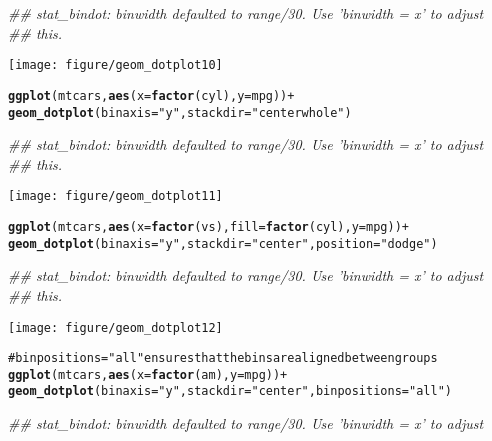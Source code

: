 \documentclass[a4paper,titlepage]{tufte-handout}\usepackage{graphicx, color}
\makeatletter
\def\maxwidth{ %
  \ifdim\Gin@nat@width>\linewidth
    \linewidth
  \else
    \Gin@nat@width
  \fi
}
\newcommand{\hlfunctioncall}[1]{\textcolor[rgb]{0.501960784313725,0,0.329411764705882}{\textbf{#1}}}%
\newcommand{\hlstring}[1]{\textcolor[rgb]{0.6,0.6,1}{#1}}%
\newenvironment{kframe}{%
 \def\at@end@of@kframe{}%
 \ifinner\ifhmode%
  \def\at@end@of@kframe{\end{minipage}}%
  \begin{minipage}{\columnwidth}%
 \fi\fi%
 \def\FrameCommand##1{\hskip\@totalleftmargin \hskip-\fboxsep
 \colorbox{shadecolor}{##1}\hskip-\fboxsep
     \hskip-\linewidth \hskip-\@totalleftmargin \hskip\columnwidth}%
 \MakeFramed {\advance\hsize-\width
   \@totalleftmargin\z@ \linewidth\hsize
   \@setminipage}}%
 {\par\unskip\endMakeFramed%
 \at@end@of@kframe}
\newenvironment{knitrout}{}{} %
\makeatother
\begin{document}
\begin{knitrout}
\begin{kframe}
\begin{alltt}
\end{alltt}
\begin{flushleft}\ttfamily\noindent\itshape\textcolor{messagecolor}{\#\# stat\_bindot: binwidth defaulted to range/30. Use 'binwidth = x' to adjust \\ 
\#\# this.}\end{flushleft}\end{kframe}\texttt{[image: figure/geom\_dotplot10]} \begin{kframe}\begin{alltt}
\hlfunctioncall{ggplot}(mtcars, \hlfunctioncall{aes}(x = \hlfunctioncall{factor}(cyl), y = mpg)) +
  \hlfunctioncall{geom_dotplot}(binaxis = \hlstring{"y"}, stackdir = \hlstring{"centerwhole"})
\end{alltt}
\begin{flushleft}\ttfamily\noindent\itshape\textcolor{messagecolor}{\#\# stat\_bindot: binwidth defaulted to range/30. Use 'binwidth = x' to adjust \\ 
\#\# this.}\end{flushleft}\end{kframe}\texttt{[image: figure/geom\_dotplot11]} \begin{kframe}\begin{alltt}
\hlfunctioncall{ggplot}(mtcars, \hlfunctioncall{aes}(x = \hlfunctioncall{factor}(vs), fill = \hlfunctioncall{factor}(cyl), y = mpg)) +
  \hlfunctioncall{geom_dotplot}(binaxis = \hlstring{"y"}, stackdir = \hlstring{"center"}, position = \hlstring{"dodge"})
\end{alltt}
\begin{flushleft}\ttfamily\noindent\itshape\textcolor{messagecolor}{\#\# stat\_bindot: binwidth defaulted to range/30. Use 'binwidth = x' to adjust \\ 
\#\# this.}\end{flushleft}\end{kframe}\texttt{[image: figure/geom\_dotplot12]} \begin{kframe}\begin{alltt}
# binpositions=\hlstring{"all"} ensures that the bins are aligned between groups
\hlfunctioncall{ggplot}(mtcars, \hlfunctioncall{aes}(x = \hlfunctioncall{factor}(am), y = mpg)) +
  \hlfunctioncall{geom_dotplot}(binaxis = \hlstring{"y"}, stackdir = \hlstring{"center"}, binpositions=\hlstring{"all"})
\end{alltt}
\begin{flushleft}\ttfamily\noindent\itshape\textcolor{messagecolor}{\#\# stat\_bindot: binwidth defaulted to range/30. Use 'binwidth = x' to adjust \\ 
}
\end{flushleft}
\end{kframe}
\end{knitrout}
\end{document}
